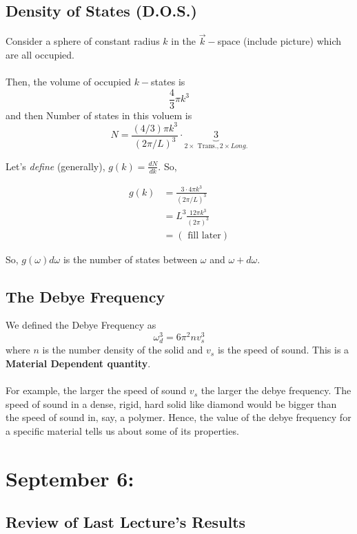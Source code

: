 \documentclass[11pt]{article}
\begin{document}
\subsection*{Density of States (D.O.S.)}
Consider a sphere of constant radius $k$ in the $\vec{k}-$space (include picture) which are all occupied.
\\
\\
Then, the volume of occupied $k-$states is  \[ \frac{4}{3} \pi k^3 \] and then Number of states in this voluem is 
\[ N = \frac{(4/3)\pi k^3}{\left(2\pi/L\right)^3} \cdot \underbrace{3}_{2 \times \text{ Trans.}, 2 \times { Long.}} \] 

Let's \textit{define} (generally), $g(k) = \frac{dN}{dk}$. So, 

\begin{align*}
  g(k) &= \frac{3 \cdot 4 \pi k^3}{(2\pi / L)^3} \\
  &= L^3 \frac{12 \pi k^3}{(2\pi)^3} \\
  &= (\text{ fill later})
\end{align*}

So, $g(\omega) d\omega$ is the number of states between $\omega$ and $\omega + d\omega$.

\subsection*{The Debye Frequency}
We defined the Debye Frequency as 
\[ \omega_d^3 = 6 \pi^2 n v_s^3 \]
where $n$ is the number density of the solid and $v_s$ is the speed of sound. This is a \textbf{Material Dependent quantity}.
\\
\\
For example, the larger the speed of sound $v_s$ the larger the debye frequency. The speed of sound in a dense, rigid, hard solid like diamond would be bigger than the speed of sound in, say, a polymer. Hence, the value of the debye frequency for a specific material tells us about some of its properties.


\pagebreak
\section{September 6: }

\subsection*{Review of Last Lecture's Results}
\end{document}
